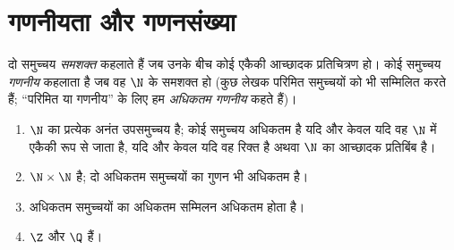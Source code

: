 \section{गणनीयता और गणनसंख्या}

\begin{definition}\label{def:b2:structures:countable}
दो समुच्चय \emph{समशक्त} कहलाते हैं जब उनके बीच कोई
एकैकी आच्छादक प्रतिचित्रण हो। कोई समुच्चय \emph{गणनीय} कहलाता है जब वह $\N$ के समशक्त हो (कुछ लेखक परिमित समुच्चयों को
भी सम्मिलित करते हैं; ``परिमित या गणनीय'' के लिए हम \emph{अधिकतम गणनीय}
कहते हैं)।
\end{definition}

\begin{proposition}[स्थायित्व के गुणधर्म]\label{prop:b2:structures:countablestable}
\begin{enumerate}
  \item $\N$ का प्रत्येक अनंत उपसमुच्चय  है; कोई समुच्चय अधिकतम
         है यदि और केवल यदि वह $\N$ में एकैकी रूप से जाता है, यदि
        और केवल यदि वह रिक्त है अथवा $\N$ का आच्छादक प्रतिबिंब है।
  \item $\N \times \N$  है; दो अधिकतम  समुच्चयों का गुणन भी अधिकतम
         है।
  \item अधिकतम  समुच्चयों का अधिकतम  सम्मिलन अधिकतम 
        होता है।
  \item $\Z$ और $\Q$  हैं।
\end{enumerate}
\end{proposition}

